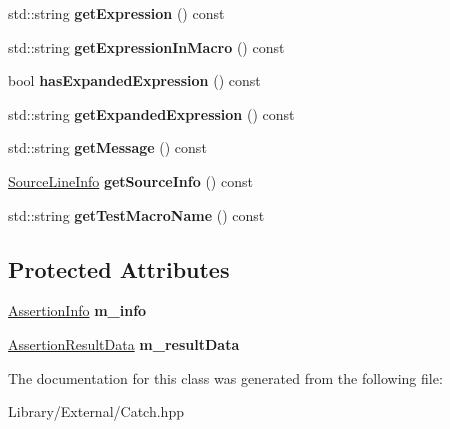 \begin{DoxyCompactItemize}
\item 
\hypertarget{class_catch_1_1_assertion_result_a6105300b90d66b5c11b69813f83d074d}{}std\+::string {\bfseries get\+Expression} () const \label{class_catch_1_1_assertion_result_a6105300b90d66b5c11b69813f83d074d}

\item 
\hypertarget{class_catch_1_1_assertion_result_ac368a7490af7669decd58efea7d7dc54}{}std\+::string {\bfseries get\+Expression\+In\+Macro} () const \label{class_catch_1_1_assertion_result_ac368a7490af7669decd58efea7d7dc54}

\item 
\hypertarget{class_catch_1_1_assertion_result_a122c369bd49430a304e3eaebdf184f36}{}bool {\bfseries has\+Expanded\+Expression} () const \label{class_catch_1_1_assertion_result_a122c369bd49430a304e3eaebdf184f36}

\item 
\hypertarget{class_catch_1_1_assertion_result_a675d074588875eb62b0b6e36e05d65e6}{}std\+::string {\bfseries get\+Expanded\+Expression} () const \label{class_catch_1_1_assertion_result_a675d074588875eb62b0b6e36e05d65e6}

\item 
\hypertarget{class_catch_1_1_assertion_result_a9793bfc4d24678c8a013bda84a5aa905}{}std\+::string {\bfseries get\+Message} () const \label{class_catch_1_1_assertion_result_a9793bfc4d24678c8a013bda84a5aa905}

\item 
\hypertarget{class_catch_1_1_assertion_result_a68b73fe982a97fe6432af679af1a2dad}{}\hyperlink{struct_catch_1_1_source_line_info}{Source\+Line\+Info} {\bfseries get\+Source\+Info} () const \label{class_catch_1_1_assertion_result_a68b73fe982a97fe6432af679af1a2dad}

\item 
\hypertarget{class_catch_1_1_assertion_result_a2901d41b199258ff6a44571b147169dd}{}std\+::string {\bfseries get\+Test\+Macro\+Name} () const \label{class_catch_1_1_assertion_result_a2901d41b199258ff6a44571b147169dd}

\end{DoxyCompactItemize}
\subsection*{Protected Attributes}
\begin{DoxyCompactItemize}
\item 
\hypertarget{class_catch_1_1_assertion_result_a3e7236f73a51d6fc8bb9dfdefcee7772}{}\hyperlink{struct_catch_1_1_assertion_info}{Assertion\+Info} {\bfseries m\+\_\+info}\label{class_catch_1_1_assertion_result_a3e7236f73a51d6fc8bb9dfdefcee7772}

\item 
\hypertarget{class_catch_1_1_assertion_result_add3455b8bbedb0d643e18da67c66b4f7}{}\hyperlink{struct_catch_1_1_assertion_result_data}{Assertion\+Result\+Data} {\bfseries m\+\_\+result\+Data}\label{class_catch_1_1_assertion_result_add3455b8bbedb0d643e18da67c66b4f7}

\end{DoxyCompactItemize}


The documentation for this class was generated from the following file\+:\begin{DoxyCompactItemize}
\item 
Library/\+External/Catch.\+hpp\end{DoxyCompactItemize}
